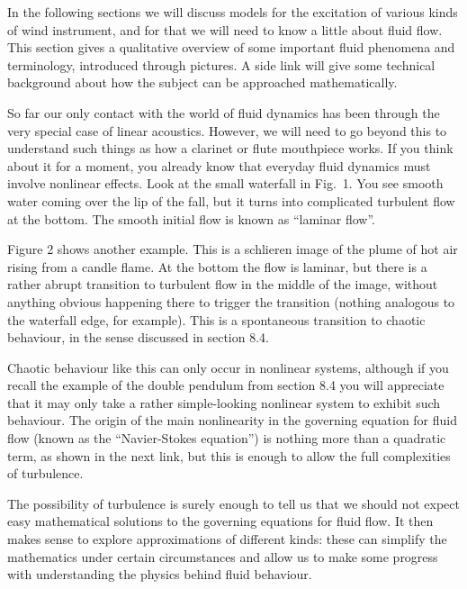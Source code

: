 

  In the following sections we will discuss models for the excitation of 
  various kinds of wind instrument, and for that we will need to know a little 
  about fluid flow. This section gives a qualitative overview of some important 
  fluid phenomena and terminology, introduced through pictures. A side link 
  will give some technical background about how the subject can be approached 
  mathematically. 


  So far our only contact with the world of fluid dynamics has been through the 
  very special case of linear acoustics. However, we will need to go beyond 
  this to understand such things as how a clarinet or flute mouthpiece works. 
  If you think about it for a moment, you already know that everyday fluid 
  dynamics must involve nonlinear effects. Look at the small waterfall in Fig.\ 
  1. You see smooth water coming over the lip of the fall, but it turns into 
  complicated turbulent flow at the bottom. The smooth initial flow is known as 
  “laminar flow”. 

  Figure 2 shows another example. This is a schlieren image of the plume of hot 
  air rising from a candle flame. At the bottom the flow is laminar, but there 
  is a rather abrupt transition to turbulent flow in the middle of the image, 
  without anything obvious happening there to trigger the transition (nothing 
  analogous to the waterfall edge, for example). This is a spontaneous 
  transition to chaotic behaviour, in the sense discussed in section 8.4. 

  Chaotic behaviour like this can only occur in nonlinear systems, although if 
  you recall the example of the double pendulum from section 8.4 you will 
  appreciate that it may only take a rather simple-looking nonlinear system to 
  exhibit such behaviour. The origin of the main nonlinearity in the governing 
  equation for fluid flow (known as the “Navier-Stokes equation”) is nothing 
  more than a quadratic term, as shown in the next link, but this is enough to 
  allow the full complexities of turbulence. 

  The possibility of turbulence is surely enough to tell us that we should not 
  expect easy mathematical solutions to the governing equations for fluid flow. 
  It then makes sense to explore approximations of different kinds: these can 
  simplify the mathematics under certain circumstances and allow us to make 
  some progress with understanding the physics behind fluid behaviour. 

